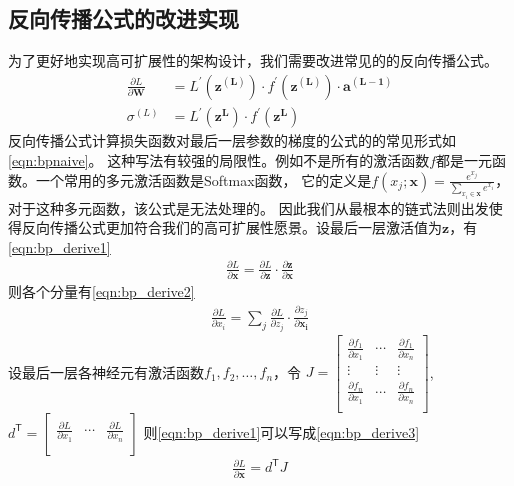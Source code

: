 \documentclass[a4paper,twoside,twocolumn]{article}
\begin{document}
\begin{spacing}{1.2}
\subsection{反向传播公式的改进实现}

为了更好地实现高可扩展性的架构设计，我们需要改进常见的的反向传播公式。
\begin{equation}
	\label{eqn:bpnaive}
	\begin{aligned}
		\frac{\partial L}{\partial \mathbf{W}}&=L^{'}(\mathbf{z^{(L)}})\cdot f^{'}(\mathbf{z^{(L)}})\cdot \mathbf{a^{(L-1)}}\\
		\sigma^{(L)}&=L^{'}(\mathbf{z^L})\cdot f^{'}(\mathbf{z^L})
	\end{aligned}
\end{equation}
反向传播公式计算损失函数对最后一层参数的梯度的公式的的常见形式如\eqref{eqn:bpnaive}。
这种写法有较强的局限性。例如不是所有的激活函数$f$都是一元函数。一个常用的多元激活函数是Softmax函数，
它的定义是$f(x_j;\mathbf{x})=\frac{e^{x_j}}{\sum_{x_i\in \mathbf{x}} e^{x_i}}$，对于这种多元函数，该公式是无法处理的。
因此我们从最根本的链式法则出发使得反向传播公式更加符合我们的高可扩展性愿景。设最后一层激活值为$\mathbf{z}$，有\eqref{eqn:bp_derive1}
\begin{equation}
	\label{eqn:bp_derive1}
	\begin{aligned}
		\frac{\partial L}{\partial \mathbf{x}}=
		\frac{\partial L}{\partial \mathbf{z}}\cdot\frac{\partial \mathbf{z}}{\partial \mathbf{x}}
	\end{aligned}
\end{equation}
则各个分量有\eqref{eqn:bp_derive2}
\begin{equation}
	\label{eqn:bp_derive2}
	\begin{aligned}
		\frac{\partial L}{\partial x_i}=
		\sum_j\frac{\partial L}{\partial z_j}\cdot\frac{\partial z_j}{\partial \mathbf{x_i}}
	\end{aligned}
\end{equation}
设最后一层各神经元有激活函数$f_1, f_2, \ldots, f_n$，令
\(
J=\begin{bmatrix}
	\frac{\partial f_1}{\partial x_1}&\cdots&\frac{\partial f_1}{\partial x_n}\\
	\vdots&\vdots&\vdots\\
	\frac{\partial f_n}{\partial x_1}&\cdots&\frac{\partial f_n}{\partial x_n}\\
\end{bmatrix}
\),
\(
d^\mathsf{T}=\begin{bmatrix}
	\frac{\partial L}{\partial x_1}&\cdots&\frac{\partial L}{\partial x_n}\\
\end{bmatrix}
\)
则\eqref{eqn:bp_derive1}可以写成\eqref{eqn:bp_derive3}
\begin{equation}
	\label{eqn:bp_derive3}
	\begin{aligned}
		\frac{\partial L}{\partial \mathbf{x}}=
		d^\mathsf{T} J
	\end{aligned}
\end{equation}


\end{spacing}
\end{document}

